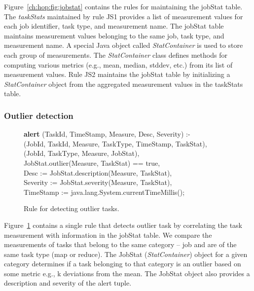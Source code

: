 Figure~\ref{ch:hop:fig:jobstat} contains the rules for maintaining the jobStat table. 
The {\em taskStats} maintained by rule JS1 provides a list of measurement values 
for each job identifier, task type, and measurement name. The jobStat table maintains
measurement values belonging to the same job, task type, and measurement name. 
A special Java object called {\em StatContainer} is used to store each group of measurements. 
The {\em StatContainer} class defines methods for computing various metrics (e.g., mean, median, stddev, etc.)
from its list of measurement values. Rule JS2 maintains the jobStat table by initializing a {\em StatContainer} object from the aggregated measurement 
values in the taskStats table.


\subsubsection{Outlier detection} 

\begin{figure}
\ssp
\centering
\begin{boxedminipage}{\linewidth}
{\bf alert} (TaskId, TimeStamp, Measure, Desc, Severity) :- \\
(JobId, TaskId, Measure, TaskType, TimeStamp, TaskStat), \\
(JobId, TaskType, Measure, JobStat),  \\
\datalogspace JobStat.outlier(Measure, TaskStat) == true, \\
\datalogspace Desc := JobStat.description(Measure, TaskStat), \\
\datalogspace Severity := JobStat.severity(Measure, TaskStat), \\
\datalogspace TimeStamp := java.lang.System.currentTimeMillis(); \\
\end{boxedminipage}
\caption{\label{ch:hop:fig:outlier} Rule for detecting outlier tasks. }
\end{figure}

Figure~\ref{ch:hop:fig:outlier} contains a single rule that detects outlier task by correlating the
task measurement with information in the jobStat table. We compare the measurements of
tasks that belong to the same category -- job and are of the same task type (map or reduce). 
The JobStat ({\em StatContainer}) object for a given category determines if a task belonging
to that category is an outlier based on some metric e.g., k deviations from the mean. 
The JobStat object also provides a description and severity of the alert tuple. 

